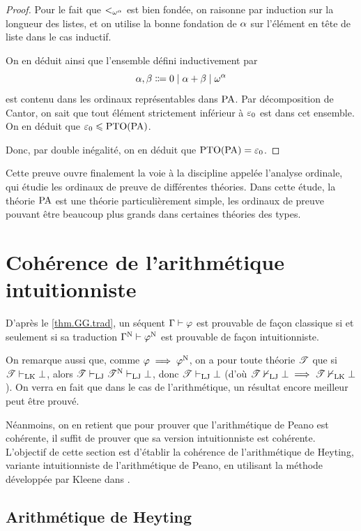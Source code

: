 \begin{proof}
  Pour le fait que $<_{\omega^\alpha}$ est bien fondée, on raisonne par
  induction sur la longueur des listes, et on utilise la bonne fondation de
  $\alpha$ sur l'élément en tête de liste dans le cas inductif.

  On en déduit ainsi que l'ensemble défini inductivement par
  \[\varOa,\varOb \inddefeq 0 \mid \varOa + \varOb \mid \Ow^\varOa\]
  est contenu dans les ordinaux représentables dans $\operatorname{PA}$. Par
  décomposition de Cantor, on sait que tout élément strictement inférieur à
  $\varepsilon_{0}$ est dans cet ensemble. On en déduit que $\varepsilon_{0} \leqslant \operatorname{PTO}(\operatorname{PA})$.

  Donc, par double inégalité, on en déduit que $\operatorname{PTO}(\operatorname{PA}) = \varepsilon_{0}$.
\end{proof}

Cette preuve ouvre finalement la voie à la discipline appelée l'analyse
ordinale, qui étudie les ordinaux de preuve de différentes théories. Dans cette
étude, la théorie $\operatorname{PA}$ est une théorie particulièrement simple, les
ordinaux de preuve pouvant être beaucoup plus grands dans certaines théories des
types.

\section{Cohérence de l'arithmétique intuitionniste}

D'après le \cref{thm.GG.trad}, un séquent $\Gamma\vdash \varphi$ est prouvable
de façon classique si et seulement si sa traduction
$\Gamma^{\mathrm{N}}\vdash \varphi^{\mathrm{N}}$ est prouvable de façon intuitionniste.

On remarque aussi que, comme $\varphi\implies \varphi^{\mathrm{N}}$, on a pour toute
théorie $\mathscr T$ que si $\mathscr T \vdash_{\operatorname{LK}} \bot$, alors
$\mathscr T \vdash_{\operatorname{LJ}}\mathscr T^{\mathrm{N}} \vdash_{\operatorname{LJ}} \bot$, donc $\mathscr T \vdash_{\operatorname{LJ}} \bot$ (d'où
$\mathscr T\nvdash_{\operatorname{LJ}}\bot\implies \mathscr T\nvdash_{\operatorname{LK}}\bot$).
On verra en fait que dans le cas de l'arithmétique, un résultat encore meilleur
peut être prouvé.

Néanmoins, on en retient que pour prouver que l'arithmétique de Peano est
cohérente, il suffit de prouver que sa version intuitionniste est cohérente.
L'objectif de cette section est d'établir la cohérence de l'arithmétique de
Heyting, variante intuitionniste de l'arithmétique de Peano, en utilisant la
méthode développée par Kleene dans
\cite{Kleene1945}.

\subsection{Arithmétique de Heyting}

